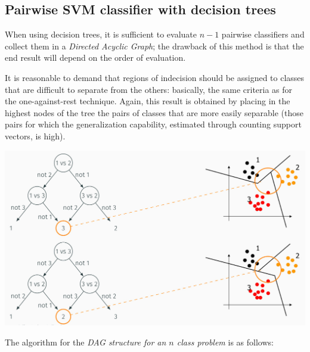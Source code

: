 \documentclass[10pt]{report}
\begin{document}
\subsection{Pairwise SVM classifier with decision trees}
\label{sec:orgd6c6750}

When using decision trees, it is sufficient to evaluate \(n -1\) pairwise classifiers and collect them in a \emph{Directed Acyclic Graph}; the drawback of this method is that the end result will depend on the order of evaluation.

It is reasonable to demand that regions of indecision should be assigned to
classes that are difficult to separate from the others: basically, the same
criteria as for the one\--against\--rest technique. Again, this result is
obtained by placing in the highest nodes of the tree the pairs of classes that
are more easily separable (those pairs for which the generalization capability,
estimated through counting support vectors, is high).

\begin{center}
\includegraphics[width=.9\linewidth]{./pics/svm/svm-pair-2.jpg}
\end{center}

The algorithm for the \emph{DAG structure for an \(n\) class problem} is as follows:
\end{document}
